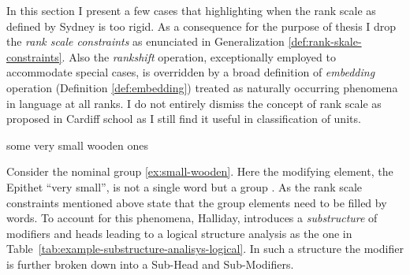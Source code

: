 In this section I present a few cases that highlighting when the rank scale as defined by Sydney is too rigid. As a consequence for the purpose of thesis I drop the \textit{rank scale constraints} as enunciated in Generalization \ref{def:rank-skale-constraints}. Also the \textit{rankshift} operation, exceptionally employed to accommodate special cases, is overridden by a broad definition of \textit{embedding}  operation (Definition \ref{def:embedding}) treated as naturally occurring phenomena in language at all ranks. I do not entirely dismiss the concept of rank scale as proposed in Cardiff school as I still find it useful in classification of units.


\begin{exe}
    \ex \label{ex:small-wooden} some very small wooden ones
\end{exe}

Consider the nominal group \ref{ex:small-wooden}. Here the modifying element, the Epithet ``very small'', is not a single word but a group \citep[390--396]{Halliday2013}. As the rank scale constraints mentioned above state that the group elements need to be filled by words. To account for this phenomena, Halliday, introduces a \textit{substructure} of modifiers and heads leading to a logical structure analysis as the one in \mbox{Table \ref{tab:example-substructure-analisys-logical}}. In such a structure the modifier is further broken down into a Sub-Head and Sub-Modifiers. 

